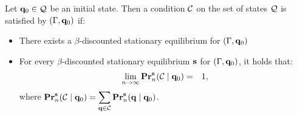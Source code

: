 \documentclass{article}
\begin{document}
\begin{mydef}
Let $\mathbf{q}_0 \in \mathcal{Q}$ be an initial state. Then a condition $\mathcal{C}$ on the set of states $\mathcal{Q}$ is satisfied by $(\Gamma, \mathbf{q}_0)$ if:
	\begin{itemize}
		\item There exists a $\beta$-discounted stationary equilibrium for $(\Gamma, \mathbf{q}_0)$
		
		\item For every $\beta$-discounted stationary equilibrium $\mathbf{s}$ for $(\Gamma, \mathbf{q}_0)$, it holds that:
\begin{eqnarray*}
\lim_{n \to \infty} \mathbf{Pr}_n^{\mathbf{s}}(\mathcal{C} \mid \mathbf{q}_0) & = & 1, 
\end{eqnarray*}
where ${\displaystyle \mathbf{Pr}_n^{\mathbf{s}}(\mathcal{C} \mid \mathbf{q}_0) = \sum_{\mathbf{q} \in \mathcal{C}} \mathbf{Pr}_n^{\mathbf{s}}(\mathbf{q} \mid \mathbf{q}_0)}$. 

		\end{itemize}
\end{mydef}


\end{document}
